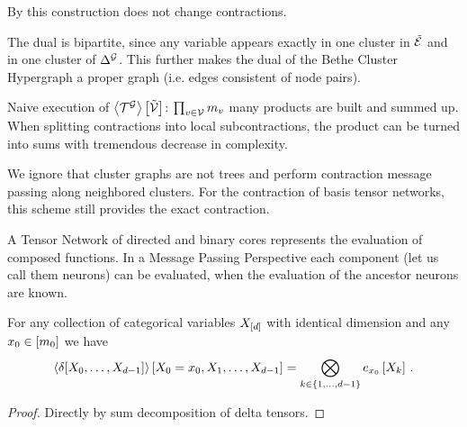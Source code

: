 By  this construction does not change contractions.

The dual is bipartite, since any variable appears exactly in one cluster in $\tilde{\mathcal{E}}$ and in one cluster of $\Delta^{\mathcal{G}}$.
This further makes the dual of the Bethe Cluster Hypergraph a proper graph (i.e. edges consistent of node pairs). 







Naive execution of $\left\langle \mathcal{T}^{\mathcal{G}}\right\rangle \left[ \tilde{\mathcal{V}} \right]$: $\prod_{v\in\mathcal{V}} m_{v}$ many products are built and summed up.
When splitting contractions into local subcontractions, the product can be turned into sums with tremendous decrease in complexity.










We ignore that cluster graphs are not trees and perform contraction message passing along neighbored clusters.
For the contraction of basis tensor networks, this scheme still provides the exact contraction.



A Tensor Network of directed and binary cores represents the evaluation of composed functions.
In a Message Passing Perspective each component (let us call them neurons) can be evaluated, when the evaluation of the ancestor neurons are known.

\begin{lemma}\label{lem:diracConBasis}
	For any collection of categorical variables $X_{[d]}$ with identical dimension and any $x_{0}\in[m_{0}]$ we have
		\[ \left\langle \delta[X_{0},\ldots,X_{d-1}]\right\rangle \left[ X_{0}=x_{0},X_{1},\ldots,X_{d-1} \right] 
		= \bigotimes_{k\in\{1,\ldots,d-1\}} e_{x_{0}}\left[X_{k}\right] \, . \]
\end{lemma}
\begin{proof}
	Directly by sum decomposition of delta tensors.
\end{proof}

